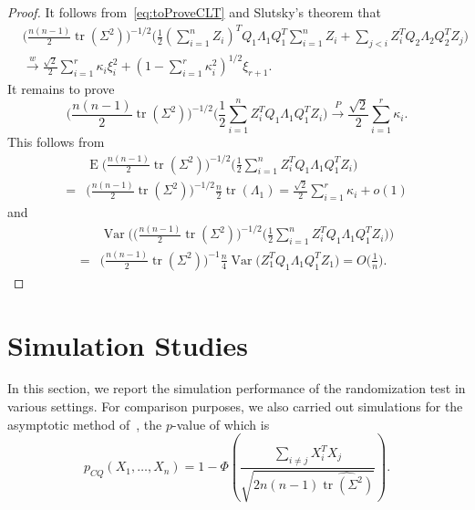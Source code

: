 \documentclass[review]{elsarticle}
\DeclareMathOperator{\mytr}{tr}
\DeclareMathOperator{\myE}{E}
\DeclareMathOperator{\myVar}{Var}
\theoremstyle{plain}
\theoremstyle{definition}
\theoremstyle{remark}
\begin{document}
\begin{proof}
    

    It follows from~\eqref{eq:toProveCLT} and Slutsky's theorem that
    $$
    \begin{aligned}
        &\big(\frac{n(n-1)}{2}\mytr(\Sigma^2)\big)^{-1/2}
    \Big(
        \frac{1}{2}(\sum_{i=1}^n  Z_i)^T Q_1\Lambda_1 Q_1^T \sum_{i=1}^n  Z_i +
    \sum_{j<i}Z_i^T Q_2 \Lambda_2 Q_2^T Z_j
    \Big)
        \\
        &\xrightarrow{w} \frac{\sqrt{2}}{2}\sum_{i=1}^r \kappa_i \xi_i^2+ (1-\sum_{i=1}^r \kappa_i^2)^{1/2}\xi_{r+1}.
    \end{aligned}
    $$
    It remains to prove
        $$
      \big(\frac{n(n-1)}{2}\mytr(\Sigma^2)\big)^{-1/2}  \Big(\frac{1}{2}\sum_{i=1}^n Z_i^T Q_1 \Lambda_1 Q_1^T Z_i\Big)\xrightarrow{P}\frac{\sqrt{2}}{2}\sum_{i=1}^r \kappa_i.
        $$
        This follows from
        $$
        \begin{aligned}
            &\myE\big(\frac{n(n-1)}{2}\mytr(\Sigma^2)\big)^{-1/2}  \Big(\frac{1}{2}\sum_{i=1}^n Z_i^T Q_1 \Lambda_1 Q_1^T Z_i\Big)\\
            =&\big(\frac{n(n-1)}{2}\mytr(\Sigma^2)\big)^{-1/2} \frac{n}{2}\mytr(\Lambda_1)=\frac{\sqrt{2}}{2}\sum_{i=1}^r \kappa_i+o(1)
        \end{aligned}
        $$
        and
        $$
        \begin{aligned}
            &\myVar\Big(\big(\frac{n(n-1)}{2}\mytr(\Sigma^2)\big)^{-1/2}  \Big(\frac{1}{2}\sum_{i=1}^n Z_i^T Q_1 \Lambda_1 Q_1^T Z_i\Big)\Big)\\
            =&\big(\frac{n(n-1)}{2}\mytr(\Sigma^2)\big)^{-1} \frac{n}{4}\myVar\Big(Z_1^T Q_1\Lambda_1 Q_1^T Z_1\Big)=
            O\big(\frac{1}{n}\big).
        \end{aligned}
        $$
    
\end{proof}




\section{Simulation Studies}

In this section, we report the simulation performance of the randomization test in various settings.
For comparison purposes, we also carried out simulations for the asymptotic method of~\citet{Chen2010A},
the $p$-value of which is
\begin{equation*}
p_{CQ}(X_1,\ldots,X_n)=1-\Phi\left(\frac{\sum_{i\neq j}X_i^T X_j}{\sqrt{2n(n-1)\widehat{\mytr(\Sigma^2)}}}\right).
\end{equation*}
\end{document}
